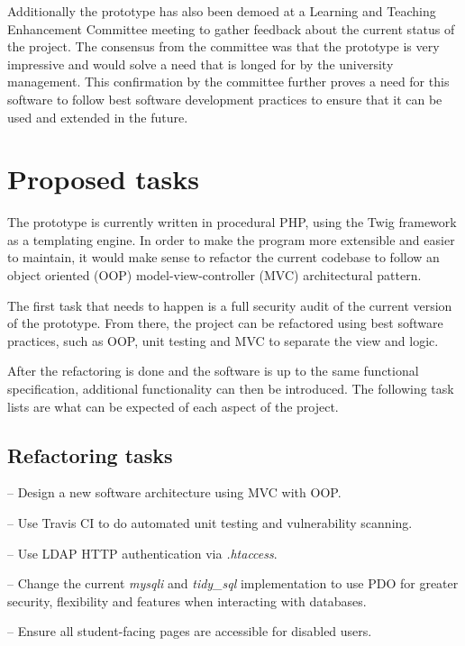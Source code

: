 \documentclass[11pt,fleqn,twoside]{article}
\begin{document}
Additionally the prototype has also been demoed at a Learning and Teaching Enhancement Committee meeting to gather feedback about the current status of the project.
The consensus from the committee was that the prototype is very impressive and would solve a need that is longed for by the university management.
This confirmation by the committee further proves a need for this software to follow best software development practices to ensure that it can be used and extended in the future.

\section{Proposed tasks}

The prototype is currently written in procedural PHP, using the Twig\cite{Twig} framework as a templating engine.
In order to make the program more extensible and easier to maintain, it would make sense to refactor the current codebase to follow an object oriented (OOP) model-view-controller (MVC)\cite{PHPMVC2}\cite{PHPMVC} architectural pattern.

The first task that needs to happen is a full security audit of the current version of the prototype.
From there, the project can be refactored using best software practices, such as OOP, unit testing and MVC to separate the view and logic.

After the refactoring is done and the software is up to the same functional specification, additional functionality can then be introduced.
The following task lists are what can be expected of each aspect of the project.

\subsection{Refactoring tasks}
\begin{description}[itemindent=-2em,leftmargin=4em]
	\item[Change procedural design] -- Design a new software architecture using MVC with OOP.
	\item[Unit Testing] -- Use Travis CI\cite{TravisCI} to do automated unit testing and vulnerability scanning.
	\item[Secure admin dashboard] -- Use LDAP HTTP authentication via \emph{.htaccess}.
	\item[PHP Data Objects (PDO)] -- Change the current \emph{mysqli} and \emph{tidy\_sql} implementation to use PDO for greater security, flexibility and features when interacting with databases.
	\item[Accessibility (a11y) audit] -- Ensure all student-facing pages are accessible for disabled users.
\end{description}
\end{document}
